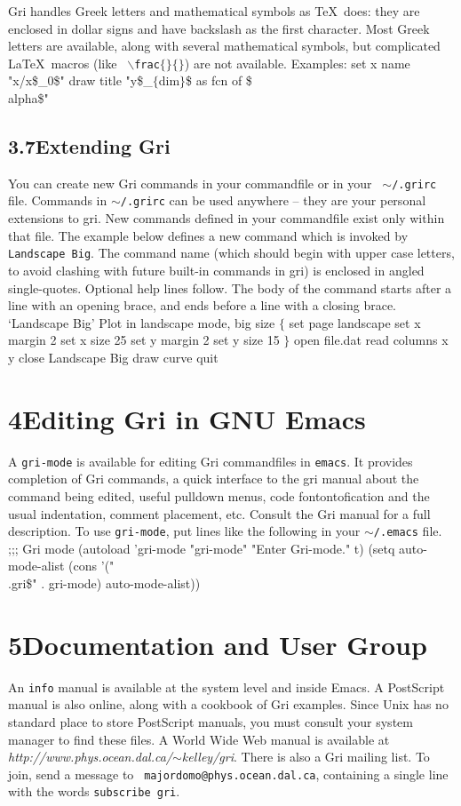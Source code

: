 Gri handles Greek letters and mathematical symbols as \TeX\ does: they
are enclosed in dollar signs and have backslash as the first
character.  Most Greek letters are available, along with several
mathematical symbols, but complicated La\TeX\ macros (like {\tt
$\backslash$frac$\lbrace\rbrace\lbrace\rbrace$}) are not available.
Examples:
\beginexample
set x name "x/x\$_0\$"
draw title "y\$_$\lbrace$dim$\rbrace$\$ as fcn of \$\\alpha\$"
\endexample



\subsection{3.7\quad Extending Gri}
You can create new Gri commands in your commandfile or in your {\tt
$\sim$/.grirc} file.  Commands in {\tt $\sim$/.grirc} can be used
anywhere -- they are your personal extensions to gri.  New commands
defined in your commandfile exist only within that file.  The example
below defines a new command which is invoked by {\tt Landscape Big}.
The command name (which should begin with upper case letters, to avoid
clashing with future built-in commands in gri) is enclosed in angled
single-quotes.  Optional help lines follow.  The body of the command
starts after a line with an opening brace, and ends before a line with
a closing brace.
\beginexample
`Landscape Big'
Plot in landscape mode, big size
$\lbrace$
    set page landscape
    set x margin 2
    set x size 25
    set y margin 2
    set y size 15
$\rbrace$
open file.dat
read columns x y
close
Landscape Big
draw curve
quit
\endexample

\section{4\quad Editing Gri in GNU Emacs}
A {\tt gri-mode} is available for editing Gri commandfiles in {\tt emacs}.
It provides completion of Gri commands, a quick interface to the gri manual
about the command being edited, useful pulldown menus, code
fontontofication and the usual indentation, comment placement, etc.
Consult the Gri manual for a full description.  To use {\tt gri-mode}, put
lines like the following in your {\tt $\sim$/.emacs} file.
\beginexample
;;; Gri mode
(autoload 'gri-mode "gri-mode" "Enter Gri-mode." t)
(setq auto-mode-alist 
    (cons '("\\.gri\$" . gri-mode) auto-mode-alist))
\endexample

\section{5\quad Documentation and User Group}
An {\tt info} manual is available at the system level and inside
Emacs.  A PostScript manual is also online, along with a cookbook of
Gri examples.  Since Unix has no standard place to store PostScript
manuals, you must consult your system manager to find these files.  A
World Wide Web manual is available at {\it
  http://www.phys.ocean.dal.ca/}$\sim${\it kelley/gri}.
There is also a Gri mailing list.  To join, send a message to {\tt
  majordomo@phys.ocean.dal.ca}, containing a single line with the
words {\tt subscribe gri}.



